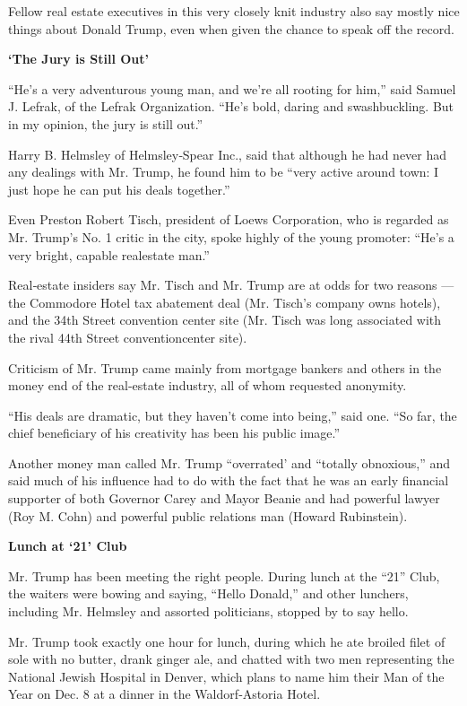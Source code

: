Fellow real estate executives in this very closely knit industry also
say mostly nice things about Donald Trump, even when given the chance to
speak off the record.

\textbf{`The Jury is Still Out'}

``He's a very adventurous young man, and we're all rooting for him,''
said Samuel J. Lefrak, of the Lefrak Organization. ``He's bold, daring
and swashbuckling. But in my opinion, the jury is still out.''

Harry B. Helmsley of Helmsley‐Spear Inc., said that although he had
never had any dealings with Mr. Trump, he found him to be ``very active
around town: I just hope he can put his deals together.''

Even Preston Robert Tisch, president of Loews Corporation, who is
regarded as Mr. Trump's No. 1 critic in the city, spoke highly of the
young promoter: ``He's a very bright, capable realestate man.''

Real‐estate insiders say Mr. Tisch and Mr. Trump are at odds for two
reasons ---the Commodore Hotel tax abatement deal (Mr. Tisch's company
owns hotels), and the 34th Street convention center site (Mr. Tisch was
long associated with the rival 44th Street conventioncenter site).

Criticism of Mr. Trump came mainly from mortgage bankers and others in
the money end of the real‐estate industry, all of whom requested
anonymity.

``His deals are dramatic, but they haven't come into being,'' said one.
``So far, the chief beneficiary of his creativity has been his public
image.''

Another money man called Mr. Trump ``overrated' and ``totally
obnoxious,'' and said much of his influence had to do with the fact that
he was an early financial supporter of both Governor Carey and Mayor
Beanie and had powerful lawyer (Roy M. Cohn) and powerful public
relations man (Howard Rubinstein).

\textbf{Lunch at `21' Club}

Mr. Trump has been meeting the right people. During lunch at the ``21''
Club, the waiters were bowing and saying, ``Hello Donald,'' and other
lunchers, including Mr. Helmsley and assorted politicians, stopped by to
say hello.

Mr. Trump took exactly one hour for lunch, during which he ate broiled
filet of sole with no butter, drank ginger ale, and chatted with two men
representing the National Jewish Hospital in Denver, which plans to name
him their Man of the Year on Dec. 8 at a dinner in the Waldorf‐Astoria
Hotel.


